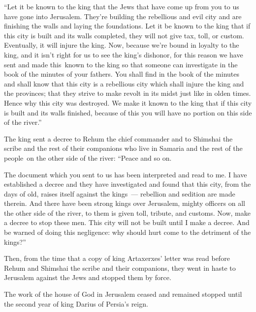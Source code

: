 \begin{inparaenum}
   ``Let it be known to the king that the Jews that have come up from you to us have gone into Jerusalem. They're building the rebellious and evil city and are finishing the walls and laying the foundations.%
   Let it be known to the king that if this city is built and its walls completed, they will not give tax, toll, or custom. Eventually, it will injure the king.%
   Now, because we're bound in loyalty to the king, and it isn't right for us to see the king's dishonor, for this reason we have sent and made this\understood\ known to the king%
   so that someone can investigate in the book of the minutes of your fathers. You shall find in the book of the minutes and shall know that this city is a rebellious city which\understood{} shall injure the king and the provinces; that they strive to make revolt in its midst just like in olden times. Hence why this city was destroyed.%
   We make it known to the king that if this city is built and its walls finished, because of this you will have no portion on this side of the river.''%
  
   The king sent a decree to Rehum the chief commander and to Shimshai the scribe and the rest of their companions who live in Samaria and the rest of the people\understood\ on the other side of the river: ``Peace and so on.%
  
   The document which you sent to us has been interpreted and read to me.%
   I have established a decree and they have investigated and found that this city, from the days of old, raises itself against the kings~--- rebellion and sedition are made therein.%
   And there have been strong kings over Jerusalem, mighty officers on all the other side of the river, to them is given toll, tribute, and customs.%
   Now, make a decree to stop these men. This city will not be built until I make a decree.%
   And be warned of doing this negligence: why should hurt come to the detriment of the kings?''%
  
   Then, from the time that a copy of king Artaxerxes' letter was read before Rehum and Shimshai the scribe and their companions, they went in haste to Jerusalem against the Jews and stopped them by force.%
  
   The work of the house of God in Jerusalem ceased and remained stopped until the second year of king Darius of Persia's reign.%
\end{inparaenum}
